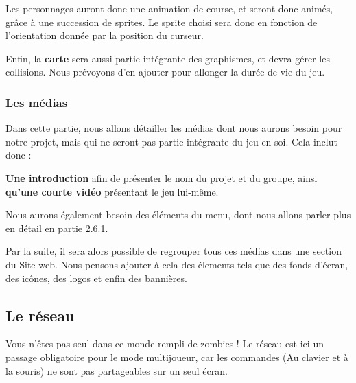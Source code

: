 \documentclass{article}
\begin{document}
\par
Les personnages auront donc une animation de course, et seront donc animés, grâce à une succession de sprites. Le sprite choisi sera donc en fonction de l'orientation donnée par la position du curseur.
\newline

\par
Enfin, la \textbf{carte} sera aussi partie intégrante des graphismes, et devra gérer les collisions. Nous prévoyons d'en ajouter pour allonger la durée de vie du jeu.
\newline

\subsubsection{Les médias}

\par
Dans cette partie, nous allons détailler les médias dont nous aurons besoin pour notre projet, mais qui ne seront pas partie intégrante du jeu en soi. Cela inclut donc :
\newline

\par
\textbf{Une introduction} afin de présenter le nom du projet et du groupe, ainsi \textbf{qu'une courte vidéo} présentant le jeu lui-même.
\newline

\par
Nous aurons également besoin des éléments du menu, dont nous allons parler plus en détail en partie 2.6.1.
\newline

\par
Par la suite, il sera alors possible de regrouper tous ces médias dans une section du Site web. Nous pensons ajouter à cela des élements tels que des fonds d'écran, des icônes, des logos et enfin des bannières.
\newline



\newpage
\subsection{Le réseau}

\par
Vous n'êtes pas seul dans ce monde rempli de zombies ! Le réseau est ici un passage obligatoire pour le mode multijoueur, car les commandes (Au clavier et à la souris) ne sont pas partageables sur un seul écran.
\newline
\end{document}
